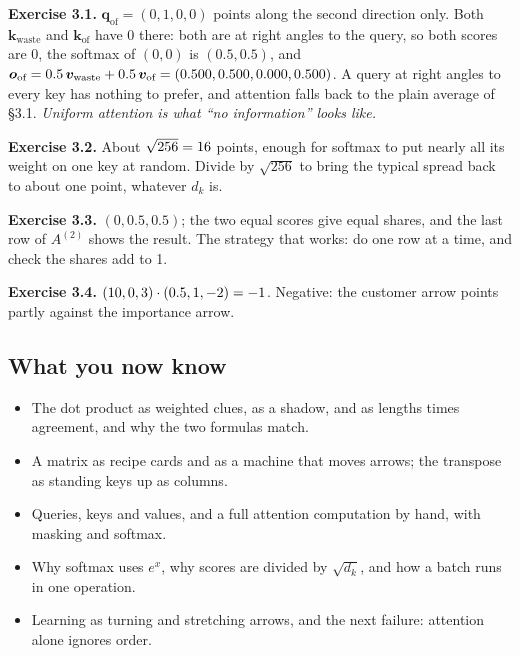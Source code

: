 \textbf{Exercise 3.1.} $\bm{q}_{\text{of}}=(0,1,0,0)$ points along the second direction only. Both
$\bm{k}_{\text{waste}}$ and $\bm{k}_{\text{of}}$ have 0 there: both are at right angles to the query, so both scores
are 0, the softmax of $(0,0)$ is $(0.5,0.5)$, and $\bm{o}_{\text{of}} = 0.5\,\bm{v}_{\text{waste}}+0.5\,\bm{v}_{\text{of}}
= (0.500, 0.500, 0.000, 0.500)$. A query at right angles to every key has nothing to prefer, and attention falls back to the plain average of
\S3.1. \emph{Uniform attention is what ``no information'' looks like.}

\textbf{Exercise 3.2.} About $\sqrt{256}=16$ points, enough for softmax to put nearly all its
weight on one key at random. Divide by $\sqrt{256}$ to bring the typical spread back to about one point, whatever
$d_k$ is.

\textbf{Exercise 3.3.} $(0, 0.5, 0.5)$; the two equal scores give equal shares, and the last row of $A^{(2)}$ shows the
result. The strategy that works: do one row at a time, and check the shares add to 1.

\textbf{Exercise 3.4.} $(10, 0, 3)\cdot(0.5, 1, -2) = -1$. Negative: the customer arrow points partly
against the importance arrow.
\normalsize

\subsection*{What you now know}
\begin{itemize}
\item The dot product as weighted clues, as a shadow, and as lengths times agreement, and why the two formulas match.
\item A matrix as recipe cards and as a machine that moves arrows; the transpose as standing keys up as columns.
\item Queries, keys and values, and a full attention computation by hand, with masking and softmax.
\item Why softmax uses $e^x$, why scores are divided by $\sqrt{d_k}$, and how a batch runs in one operation.
\item Learning as turning and stretching arrows, and the next failure: attention alone ignores order.
\end{itemize}
